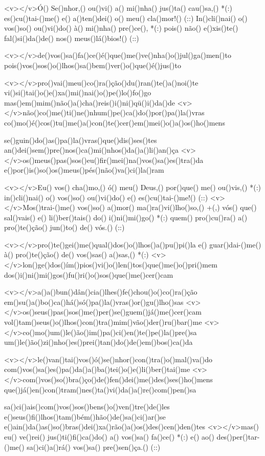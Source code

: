 <v></v>Ó() Se()nhor,() ou()vi() a() mi()nha() jus()ta() cau()sa,() *(:)
es()cu()tai-()me() e() a()ten()dei() o() meu() cla()mor!() (::)
In()cli()nai() o() vos()so() ou()vi()do() à() mi()nha() pre()ce(), *(:)
pois() não() e()xis()te() fal()si()da()de() nos() meus()lá()bios!() (::)

<v></v>de()vos()sa()fa()ce()é()que()me()ve()nha()o()jul()ga()men()to
pois()vos()sos()o()lhos()sa()bem()ver()o()que()é()jus()to

<v></v>pro()vai()meu()co()ra()ção()du()ran()te()a()noi()te
vi()si()tai()o()e()xa()mi()nai()o()pe()lo()fo()go
mas()em()mim()não()a()cha()reis()i()ni()qü()i()da()de
<v></v>não()co()me()ti()ne()nhum()pe()ca()do()por()pa()la()vras
co()mo()é()cos()tu()me()a()con()te()cer()em()mei()o()a()os()ho()mens

se()guin()do()as()pa()la()vras()que()dis()ses()tes
an()dei()sem()pre()nos()ca()mi()nhos()da()a()li()an()ça
<v></v>os()meus()pas()sos()eu()fir()mei()na()vos()sa()es()tra()da
e()por()is()so()os()meus()pés()não()va()ci()la()ram

<v></v>Eu() vos() cha()mo,() ó() meu() Deus,() por()que() me() ou()vis,() *(:)
in()cli()nai() o() vos()so() ou()vi()do() e() es()cu()tai-()me!() (::)
<v></v>Mos()trai-()me() vos()so() a()mor() ma()ra()vi()lho()so,() +(,)
vós() que() sal()vais() e() li()ber()tais() do() i()ni()mi()go() *(:)
quem() pro()cu()ra() a() pro()te()ção() jun()to() de() vós.() (::)

<v></v>pro()te()gei()me()qual()dos()o()lhos()a()pu()pi()la
e() guar()dai-()me() à() pro()te()ção() de() vos()sas() a()sas,() *(:)
<v></v>lon()ge()dos()ím()pios()vi()o()len()tos()que()me()o()pri()mem
dos()i()ni()mi()gos()fu()ri()o()sos()que()me()cer()cam

<v></v>a()a()bun()dân()cia()lhes()fe()chou()o()co()ra()ção
em()su()a()bo()ca()há()só()pa()la()vras()or()gu()lho()sas
<v></v>os()seus()pas()sos()me()per()se()guem()já()me()cer()cam
vol()tam()seus()o()lhos()con()tra()mim()vão()der()ru()bar()me
<v></v>co()mo()um()le()ão()im()pa()ci()en()te()pe()la()pre()sa
um()le()ão()zi()nho()es()prei()tan()do()de()em()bos()ca()da

<v></v>le()van()tai()vos()ó()se()nhor()con()tra()o()mal()va()do
com()vos()sa()es()pa()da()a()ba()tei()o()e()li()ber()tai()me
<v></v>com()vos()so()bra()ço()de()fen()dei()me()des()ses()ho()mens
que()já()en()con()tram()nes()ta()vi()da()a()re()com()pen()sa

sa()ci()ais()com()vos()sos()bens()o()ven()tre()de()les
e()seus()fi()lhos()tam()bém()hão()de()sa()ci()ar()se
e()ain()da()as()so()bras()dei()xa()rão()a()os()des()cen()den()tes
<v></v>mas() eu() ve()rei() jus()ti()fi()ca()do() a() vos()sa() fa()ce() *(:)
e() ao() des()per()tar-()me() sa()ci()a()rá() vos()sa() pre()sen()ça.() (::)